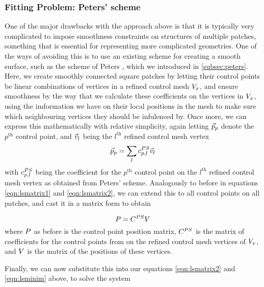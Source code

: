 \subsubsection{Fitting Problem: Peters' scheme}
One of the major drawbacks with the approach above is that it is typically very complicated to impose smoothness constraints on structures of multiple patches, something that is essential for representing more complicated geometries. One of the ways of avoiding this is to use an existing scheme for creating a smooth surface, such as the scheme of Peters \cite{peters1992constructing,eck1996automatic}, which we introduced in \autoref{subsec:peters}. Here, we create smoothly connected square \Bez patches by letting their control points be linear combinations of vertices in a refined control mesh $\petersPatchPoints$, and ensure smoothness by the way that we calculate these coefficients on the vertices in $\petersPatchPoints$, using the imformation we have on their local positions in the mesh to make sure which neighbouring vertices they should be infulenced by. Once more, we can express this mathematically with relative simplicity, again letting $\lsControlPointi{p}$ denote the $p^\text{th}$ control point, and $\petersPatchPointVec_l$ being the $l^\text{th}$ refined control mesh vertex
\begin{equation}
\lsControlPointi{p} = \sum\limits_{l} \petersControlPointCoef_{p,l} \petersPatchPointVec_l
\end{equation} 
with $\petersControlPointCoef_{p,l}$ being the coefficient for the $p^\text{th}$ \Bez control point on the $l^\text{th}$ refined control mesh vertex as obtained from Peters' scheme. Analogously to before in equations \ref{eqn:lsmatrix1} and \ref{eqn:lsmatrix2}, we can extend this to all \Bez control points on all patches, and cast it in a matrix form to obtain

\begin{equation}
\lsControlPointMatrix = \petersControlPointCoefMatrix\petersPatchPointMatrix
\end{equation}
where $\lsControlPointMatrix$ as before is the \Bez control point position matrix, $\petersControlPointCoefMatrix$ is the matrix of coefficients for the \Bez control points from on the refined control mesh vertices of $\petersPatchPoints$, and $\petersPatchPointMatrix$ is the matrix of the positions of these vertices. 

Finally, we can now substitute this into our equations \ref{eqn:lsmatrix2} and \ref{eqn:lsminim} above, to solve the system

